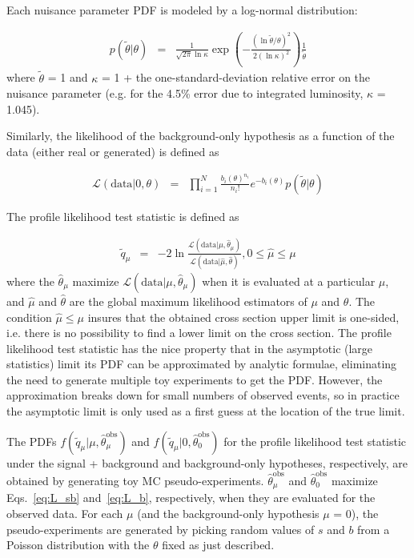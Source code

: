 \documentclass[dissertation.tex]{subfiles}
\begin{document}
Each nuisance parameter PDF is modeled by a log-normal distribution:

\begin{eqnarray}
\label{eq:log-normal}
p(\tilde{\theta} | \theta) &=& \frac{1}{\sqrt{2\pi}\ln\kappa} \exp(-\frac{(\ln\tilde{\theta}/\theta)^{2}}{2(\ln\kappa)^{2}})\frac{1}{\tilde{\theta}}
\end{eqnarray}
%
where $\tilde{\theta}$ = 1 and $\kappa$ = 1 + the one-standard-deviation relative error on the nuisance parameter (e.g. for the 4.5\% error due to integrated luminosity, $\kappa$ = 1.045).

Similarly, the likelihood of the background-only hypothesis as a function of the data (either real or generated) is defined as 

\begin{eqnarray}
\label{eq:L_b}
\mathcal{L}(\mbox{data} | 0, \theta) &=& \prod_{i = 1}^{N} \frac{b_{i}(\theta)^{n_{i}}}{n_{i}!}e^{- b_{i}(\theta)}p(\tilde{\theta} | \theta)
\end{eqnarray}

The profile likelihood test statistic is defined as 

\begin{eqnarray}
\label{eq:profile_likelihood}
\tilde{q}_{\mu} &=& -2\ln\frac{\mathcal{L}(\mbox{data} | \mu, \hat{\theta}_{\mu})}{\mathcal{L}(\mbox{data} | \hat{\mu}, \hat{\theta})}, 0 \leq \hat{\mu} \leq \mu
\end{eqnarray}
%
where the $\hat{\theta}_{\mu}$ maximize $\mathcal{L}(\mbox{data} | \mu, \hat{\theta}_{\mu})$ when it is evaluated at a particular $\mu$, and $\hat{\mu}$ and $\hat{\theta}$ are the global maximum likelihood estimators of $\mu$ and $\theta$.  The condition $\hat{\mu} \leq \mu$ insures that the obtained cross section upper limit is one-sided, i.e. there is no possibility to find a lower limit on the cross section.  The profile likelihood test statistic has the nice property that in the asymptotic (large statistics) limit its PDF can be approximated by analytic formulae, eliminating the need to generate multiple toy experiments to get the PDF.  However, the approximation breaks down for small numbers of observed events, so in practice the asymptotic limit is only used as a first guess at the location of the true limit.

The PDFs $f(\tilde{q}_{\mu} | \mu, \hat{\theta}_{\mu}^{\mathrm{obs}})$ and $f(\tilde{q}_{\mu} | 0, \hat{\theta}_{0}^{\mathrm{obs}})$ for the profile likelihood test statistic under the signal + background and background-only hypotheses, respectively, are obtained by generating toy MC pseudo-experiments.  $\hat{\theta}_{\mu}^{\mathrm{obs}}$ and $\hat{\theta}_{0}^{\mathrm{obs}}$ maximize Eqs.~\ref{eq:L_sb} and~\ref{eq:L_b}, respectively, when they are evaluated for the observed data.  For each $\mu$ (and the background-only hypothesis $\mu$ = 0), the pseudo-experiments are generated by picking random values of $s$ and $b$ from a Poisson distribution with the $\theta$ fixed as just described.
\end{document}
